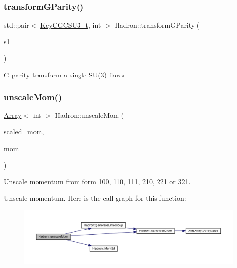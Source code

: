 \subsubsection{\texorpdfstring{transformGParity()}{transformGParity()}}
{\footnotesize\ttfamily std\+::pair$<$ \mbox{\hyperlink{structHadron_1_1KeyCGCSU3__t}{Key\+C\+G\+C\+S\+U3\+\_\+t}}, int $>$ Hadron\+::transform\+G\+Parity (\begin{DoxyParamCaption}\item[{const \mbox{\hyperlink{structHadron_1_1KeyCGCSU3__t}{Key\+C\+G\+C\+S\+U3\+\_\+t}} \&}]{s1 }\end{DoxyParamCaption})}



G-\/parity transform a single S\+U(3) flavor. 

\mbox{\label{namespaceHadron_ad5e2b22f66d2effe70db7f0ba129eae1}} 
\subsubsection{\texorpdfstring{unscaleMom()}{unscaleMom()}}
{\footnotesize\ttfamily \mbox{\hyperlink{classXMLArray_1_1Array}{Array}}$<$ int $>$ Hadron\+::unscale\+Mom (\begin{DoxyParamCaption}\item[{const \mbox{\hyperlink{classXMLArray_1_1Array}{Array}}$<$ int $>$ \&}]{scaled\+\_\+mom,  }\item[{const \mbox{\hyperlink{classXMLArray_1_1Array}{Array}}$<$ int $>$ \&}]{mom }\end{DoxyParamCaption})}



Unscale momentum from form 100, 110, 111, 210, 221 or 321. 

Unscale momentum. Here is the call graph for this function\+:
\nopagebreak
\begin{figure}[H]
\begin{center}
\leavevmode
\includegraphics[width=350pt]{d1/daf/namespaceHadron_ad5e2b22f66d2effe70db7f0ba129eae1_cgraph}
\end{center}
\end{figure}
\mbox{\label{namespaceHadron_a63c49af65c1d943a78205d3b8b63079a}} 
